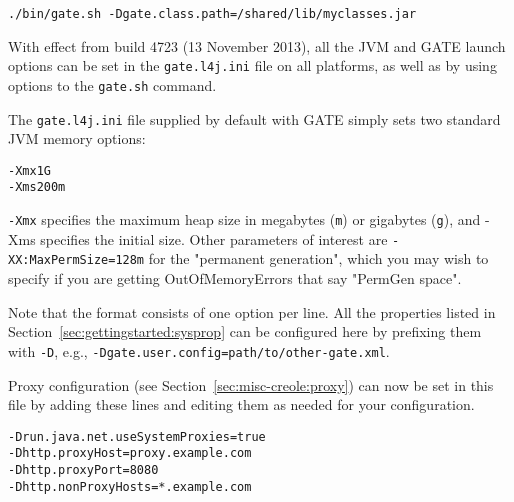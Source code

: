 \texttt{./bin/gate.sh -Dgate.class.path=/shared/lib/myclasses.jar}

%
With effect from build 4723 (13 November 2013), all the JVM and GATE launch
options can be set in the \texttt{gate.l4j.ini} file on all platforms, as well
as by using options to the \texttt{gate.sh} command.  

The \texttt{gate.l4j.ini} file supplied by default with GATE simply sets two
standard JVM memory options:
%
\begin{verbatim}
-Xmx1G
-Xms200m
\end{verbatim}
%
\texttt{-Xmx} specifies the maximum heap size in megabytes (\texttt{m}) or
gigabytes (\texttt{g}), and -Xms specifies the initial size. Other parameters of
interest are \texttt{-XX:MaxPermSize=128m} for the "permanent generation", which
you may wish to specify if you are getting OutOfMemoryErrors that say "PermGen
space".



Note that the format consists of one option per line.  All the properties listed
in Section~\ref{sec:gettingstarted:sysprop} can be configured here by prefixing
them with \texttt{-D}, e.g., \texttt{-Dgate.user.config=path/to/other-gate.xml}.


Proxy configuration (see Section~\ref{sec:misc-creole:proxy}) can now be set in
this file by adding these lines and editing them as needed for your
configuration.
%
\begin{verbatim}
-Drun.java.net.useSystemProxies=true  
-Dhttp.proxyHost=proxy.example.com  
-Dhttp.proxyPort=8080  
-Dhttp.nonProxyHosts=*.example.com 
\end{verbatim}
%

